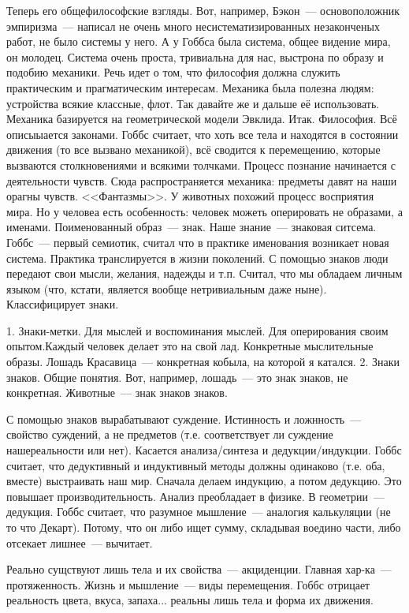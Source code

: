 Теперь его общефилософские взгляды.
Вот, например, Бэкон~--- основоположник эмпиризма~--- написал не очень много несистематизированных незаконченых работ, не было системы у него. А у Гоббса была система, общее видение мира, он молодец. Система очень проста, тривиальна для нас, выстрона по образу и подобию механики. Речь идет о том, что философия должна служить практическим и прагматическим интересам. Механика была полезна людям: устройства всякие классные, флот. Так давайте же и дальше её использовать. Механика базируется на геометрической модели Эвклида. Итак. Философия. Всё описыыается законами. Гоббс считает, что хоть все тела и находятся в состоянии движения (то все вызвано механикой), всё сводится к перемещению, которые вызваются столкновениями и всякими толчками. Процесс познание начинается с деятельности чувств. Сюда распространяется механика: предметы давят на наши орагны чувств. <<Фантазмы>>. У животных похожий процесс восприятия мира. Но у человеа есть особенность: человек можеть оперировать не образами, а именами. Поименованный образ~--- знак. Наше знание~--- знаковая ситсема. Гоббс~--- первый семиотик, считал что в практике именования возникает новая система. Практика транслируется в жизни поколений. С помощью знаков люди передают свои мысли, желания, надежды и т.п. Считал, что мы обладаем личным языком (что, кстати, является вообще нетривиальным даже ныне). Классифицирует знаки.

	1. Знаки-метки. Для мыслей и воспоминания мыслей. Для оперирования своим опытом.Каждый человек делает это на свой лад. Конкретные мыслительные образы. Лошадь Красавица~--- конкретная кобыла, на которой я катался.
	2. Знаки знаков. Общие понятия. Вот, например, лошадь~--- это знак знаков, не конкретная. Животные~--- знак знаков знаков.

С помощью знаков вырабатывают суждение. Истинность и ложнность~--- свойство суждений, а не предметов (т.е. соответствует ли суждение нашереальности или нет).
Касается анализа/синтеза и дедукции/индукции. Гоббс считает, что дедуктивный и индуктивный методы должны одинаково (т.е. оба, вместе) выстраивать наш мир. Сначала делаем индукцию, а потом дедукцию. Это повышает производительность. Анализ преобладает в физике. В геометрии~--- дедукция. Гоббс считает, что разумное мышление~--- аналогия калькуляции (не то что Декарт). Потому, что он либо ищет сумму, складывая воедино части, либо отсекает лишнее~--- вычитает.

Реально сущствуют лишь тела и их свойства~--- акциденции. Главная хар-ка~--- протяженность. Жизнь и мышление~--- виды перемещения. Гоббс отрицает реальность цвета, вкуса, запаха... реальны лишь тела и форма их движения.

